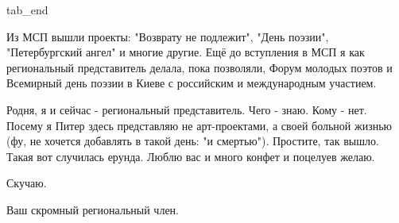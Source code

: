   tab_end
\fi

Из МСП вышли проекты: "Возврату не подлежит", "День поэзии", "Петербургский
ангел" и многие другие. Ещё до вступления в МСП я как региональный
представитель делала, пока позволяли, Форум молодых поэтов и Всемирный день
поэзии в Киеве с российским и международным участием. 

Родня, я и сейчас - региональный представитель. Чего - знаю. Кому - нет. Посему
я Питер здесь представляю не арт-проектами, а своей больной жизнью (фу, не
хочется добавлять в такой день: "и смертью"). Простите, так вышло. Такая вот
случилась ерунда. Люблю вас и много конфет и поцелуев желаю. 

Скучаю.

Ваш скромный региональный член.
